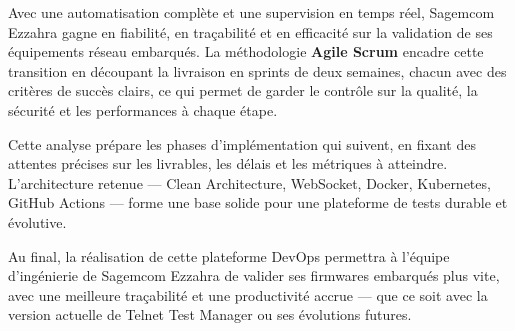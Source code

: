 Avec une automatisation complète et une supervision en temps réel,
Sagemcom Ezzahra gagne en fiabilité, en traçabilité et en efficacité
sur la validation de ses équipements réseau embarqués. La méthodologie
\textbf{Agile Scrum} encadre cette transition en découpant la livraison
en sprints de deux semaines, chacun avec des critères de succès clairs,
ce qui permet de garder le contrôle sur la qualité, la sécurité et les
performances à chaque étape.

Cette analyse prépare les phases d'implémentation qui suivent, en fixant
des attentes précises sur les livrables, les délais et les métriques à
atteindre. L'architecture retenue --- Clean Architecture, WebSocket,
Docker, Kubernetes, GitHub Actions --- forme une base solide pour une
plateforme de tests durable et évolutive.

Au final, la réalisation de cette plateforme DevOps permettra à l'équipe
d'ingénierie de Sagemcom Ezzahra de valider ses firmwares embarqués plus
vite, avec une meilleure traçabilité et une productivité accrue ---
que ce soit avec la version actuelle de Telnet Test Manager ou ses
évolutions futures.

